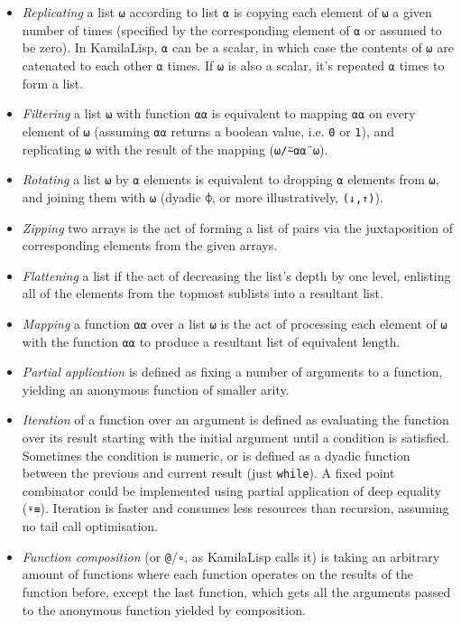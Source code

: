 \begin{itemize}
    \item \textit{Replicating} a list \verb|⍵| according to list \verb|⍺| is copying each element of \verb|⍵| a given number of times (specified by the corresponding element of \verb|⍺| or assumed to be zero). In KamilaLisp, \verb|⍺| can be a scalar, in which case the contents of \verb|⍵| are catenated to each other \verb|⍺| times. If \verb|⍵| is also a scalar, it's repeated \verb|⍺| times to form a list.
    \item \textit{Filtering} a list \verb|⍵| with function \verb|⍺⍺| is equivalent to mapping \verb|⍺⍺| on every element of \verb|⍵| (assuming \verb|⍺⍺| returns a boolean value, i.e. \verb|0| or \verb|1|), and replicating \verb|⍵| with the result of the mapping (\verb|⍵/⍨⍺⍺¨⍵|).
    \item \textit{Rotating} a list \verb|⍵| by \verb|⍺| elements is equivalent to dropping \verb|⍺| elements from \verb|⍵|, and joining them with \verb|⍵| (dyadic \verb|⌽|, or more illustratively, \verb|(↓,↑)|).
    \item \textit{Zipping} two arrays is the act of forming a list of pairs via the juxtaposition of corresponding elements from the given arrays.
    \item \textit{Flattening} a list if the act of decreasing the list's depth by one level, enlisting all of the elements from the topmost sublists into a resultant list.
    \item \textit{Mapping} a function \verb|⍺⍺| over a list \verb|⍵| is the act of processing each element of \verb|⍵| with the function \verb|⍺⍺| to produce a resultant list of equivalent length.
    \item \textit{Partial application} is defined as fixing a number of arguments to a function, yielding an anonymous function of smaller arity.
    \item \textit{Iteration} of a function over an argument is defined as evaluating the function over its result starting with the initial argument until a condition is satisfied. Sometimes the condition is numeric, or is defined as a dyadic function between the previous and current result (just \verb|while|). A fixed point combinator could be implemented using partial application of deep equality (\verb|⍣≡|). Iteration is faster and consumes less resources than recursion, assuming no tail call optimisation.
    \item \textit{Function composition} (or \verb|@|/\verb|∘|, as KamilaLisp calls it) is taking an arbitrary amount of functions where each function operates on the results of the function before, except the last function, which gets all the arguments passed to the anonymous function yielded by composition.

\end{itemize}
